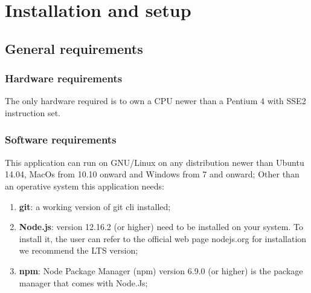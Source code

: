 \section{Installation and setup}
\subsection{General requirements}
\subsubsection{Hardware requirements}
The only hardware required is to own a CPU newer than a Pentium 4 with SSE2 instruction set. 
\subsubsection{Software requirements }
This application can run on GNU/Linux on any distribution newer than Ubuntu 14.04, MacOs from 10.10 onward and Windows from 7 and onward; Other than an operative system this application needs: 
\begin{enumerate}
	\item \textbf{git}: a working version of git cli installed;
	\item \textbf{Node.js}: version 12.16.2 (or higher) need to be installed on your system. To install it, the user can refer to the official web page nodejs.org for installation we recommend the LTS version;
	\item \textbf{npm}: Node Package Manager (npm) version 6.9.0 (or higher) is the package manager that comes with Node.Js; 
\end{enumerate}
